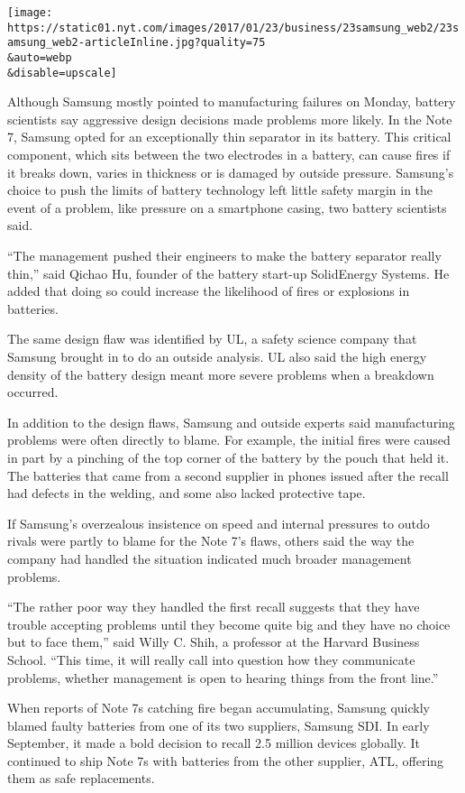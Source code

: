 \texttt{[image: https://static01.nyt.com/images/2017/01/23/business/23samsung\_web2/23samsung\_web2-articleInline.jpg?quality=75\\\&auto=webp\\\&disable=upscale]}

Although Samsung mostly pointed to manufacturing failures on Monday,
battery scientists say aggressive design decisions made problems more
likely. In the Note 7, Samsung opted for an exceptionally thin separator
in its battery. This critical component, which sits between the two
electrodes in a battery, can cause fires if it breaks down, varies in
thickness or is damaged by outside pressure. Samsung's choice to push
the limits of battery technology left little safety margin in the event
of a problem, like pressure on a smartphone casing, two battery
scientists said.

``The management pushed their engineers to make the battery separator
really thin,'' said Qichao Hu, founder of the battery start-up
SolidEnergy Systems. He added that doing so could increase the
likelihood of fires or explosions in batteries.

The same design flaw was identified by UL, a safety science company that
Samsung brought in to do an outside analysis. UL also said the high
energy density of the battery design meant more severe problems when a
breakdown occurred.

In addition to the design flaws, Samsung and outside experts said
manufacturing problems were often directly to blame. For example, the
initial fires were caused in part by a pinching of the top corner of the
battery by the pouch that held it. The batteries that came from a second
supplier in phones issued after the recall had defects in the welding,
and some also lacked protective tape.

If Samsung's overzealous insistence on speed and internal pressures to
outdo rivals were partly to blame for the Note 7's flaws, others said
the way the company had handled the situation indicated much broader
management problems.

``The rather poor way they handled the first recall suggests that they
have trouble accepting problems until they become quite big and they
have no choice but to face them,'' said Willy C. Shih, a professor at
the Harvard Business School. ``This time, it will really call into
question how they communicate problems, whether management is open to
hearing things from the front line.''

When reports of Note 7s catching fire began accumulating, Samsung
quickly blamed faulty batteries from one of its two suppliers, Samsung
SDI. In early September, it made a bold decision to recall 2.5 million
devices globally. It continued to ship Note 7s with batteries from the
other supplier, ATL, offering them as safe replacements.

